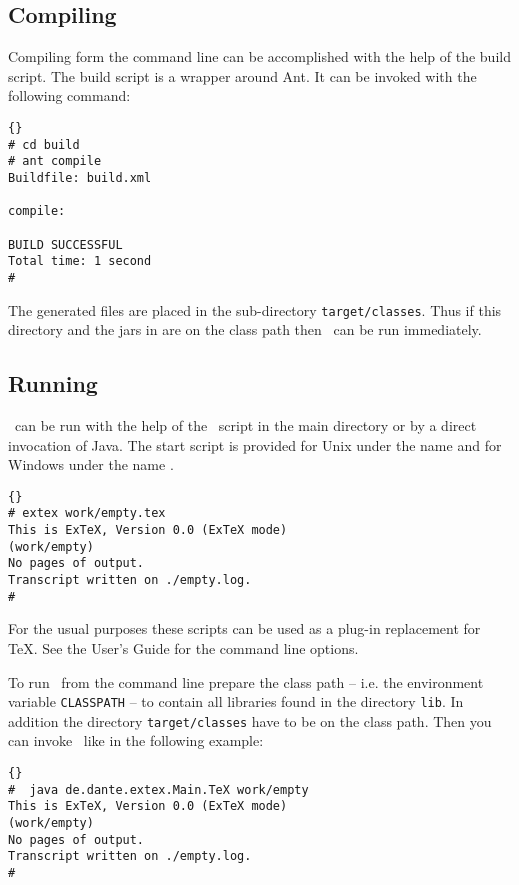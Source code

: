 \subsection{Compiling \ExTeX}\label{sec:shell-compile}

Compiling \ExTeX form the command line can be accomplished with the
help of the build script. The build script is a wrapper around Ant. It
can be invoked with the following command:

\begin{lstlisting}{}
# cd build
# ant compile
Buildfile: build.xml

compile:

BUILD SUCCESSFUL
Total time: 1 second
#
\end{lstlisting}

The generated files are placed in the sub-directory
\texttt{target/classes}. Thus if this directory and the jars in
 are on the class path then \ExTeX\ can be run immediately.


\subsection{Running \ExTeX}

\ExTeX\ can be run with the help of the \ExTeX\ script in the main
directory or by a direct invocation of Java. The start script is
provided for Unix under the name  and for Windows under
the name .
\begin{lstlisting}{}
# extex work/empty.tex
This is ExTeX, Version 0.0 (ExTeX mode)
(work/empty)
No pages of output.
Transcript written on ./empty.log.
#
\end{lstlisting}{}

For the usual purposes these scripts can be used as a plug-in
replacement for \TeX. See the User's Guide for the command line
options.

To run \ExTeX\ from the command line prepare the class path -- i.e.
the environment variable \texttt{CLASSPATH} -- to contain all
libraries found in the directory \texttt{lib}. In addition the
directory \texttt{target/classes} have to be on the class path.
Then you can invoke \ExTeX\ like in the following example:

\begin{lstlisting}{}
#  java de.dante.extex.Main.TeX work/empty
This is ExTeX, Version 0.0 (ExTeX mode)
(work/empty)
No pages of output.
Transcript written on ./empty.log.
#
\end{lstlisting}{}

